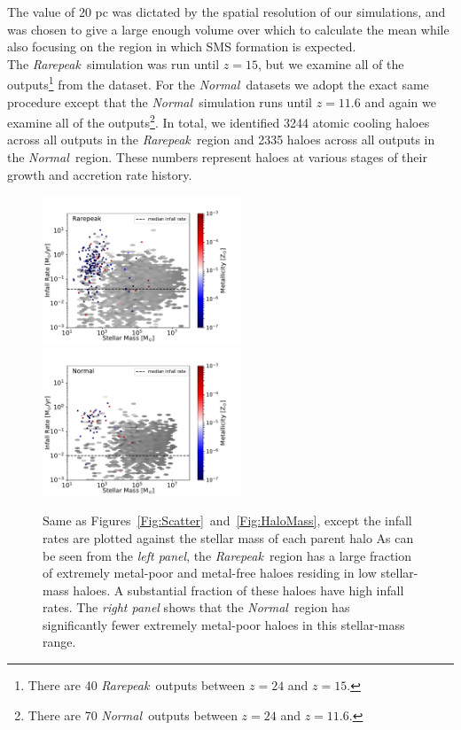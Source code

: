 \documentclass[graphics, twocolumn, usenatbib]{mn2e}
\newcommand{\rarepeak} {\textit{Rarepeak~}}
\newcommand{\normal} {\textit{Normal~}}
\begin{document}
The value of 20 pc was dictated by the spatial resolution of our simulations, and
%
was chosen to give a large enough
volume over which to calculate the mean while also focusing on the region in which SMS formation is
expected. \\
\indent The \rarepeak simulation was run until $z=15$, but we
examine all of the outputs\footnote{There are 40 \rarepeak outputs between $z = 24$ and $z = 15$.}
from the dataset. For the \normal datasets we adopt the exact same procedure except that
the \normal simulation runs until $z = 11.6$ and again we examine all of the
outputs\footnote{There are 70 \normal outputs between $z = 24$ and $z = 11.6$.}.  In total, we identified
3244 atomic cooling haloes across all outputs in the \rarepeak region and 2335
haloes across all outputs in the \normal region. These numbers represent haloes at various stages
of their growth and accretion rate history. 
\begin{figure}
\centering
\begin{minipage}{175mm}      \begin{center} 
\centerline{
\includegraphics[width=0.525\textwidth]{FIGURES/Rarepeak_MdotMstellarZ_Hexbin.pdf}
\includegraphics[width=0.525\textwidth]{FIGURES/Normal_MdotMstellarZ_Hexbin.pdf}}
\caption{Same as Figures~\ref{Fig:Scatter}~and~\ref{Fig:HaloMass}, except
the infall rates are plotted against  the stellar mass of each parent halo 
 As can be seen from the \textit{left panel}, the \rarepeak region has a large fraction of
  extremely metal-poor and metal-free haloes residing in low stellar-mass haloes. A substantial
  fraction of these haloes have high infall rates. 
  The \textit{right panel} shows that the \normal region has significantly fewer extremely metal-poor haloes in this stellar-mass range.}
\label{Fig:StellarMass}
\end{center} \end{minipage}

\end{figure}
\end{document}
